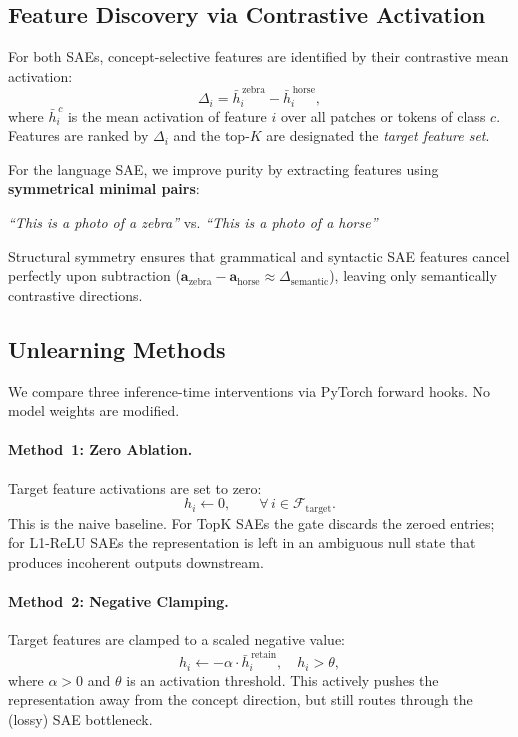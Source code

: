 \documentclass{article}
\begin{document}
\subsection{Feature Discovery via Contrastive Activation}

For both SAEs, concept-selective features are identified by their
contrastive mean activation:
\begin{equation}
  \Delta_i = \bar{h}_i^{\,\text{zebra}} - \bar{h}_i^{\,\text{horse}},
\end{equation}
where $\bar{h}_i^{\,c}$ is the mean activation of feature $i$ over all
patches or tokens of class $c$. Features are ranked by $\Delta_i$ and
the top-$K$ are designated the \emph{target feature set}.

For the language SAE, we improve purity by extracting features using
\textbf{symmetrical minimal pairs}:
\begin{center}
  \textit{``This is a photo of a zebra''}\;
  vs.\;
  \textit{``This is a photo of a horse''}
\end{center}
Structural symmetry ensures that grammatical and syntactic SAE features
cancel perfectly upon subtraction
($\mathbf{a}_{\text{zebra}} - \mathbf{a}_{\text{horse}}
 \approx \Delta_{\text{semantic}}$),
leaving only semantically contrastive directions.

\subsection{Unlearning Methods}
\label{sec:methods}

We compare three inference-time interventions via PyTorch forward hooks.
No model weights are modified.

\paragraph{Method~1: Zero Ablation.}
Target feature activations are set to zero:
\begin{equation}
  h_i \leftarrow 0, \qquad \forall\,i \in \mathcal{F}_{\text{target}}.
\end{equation}
This is the naive baseline. For TopK SAEs the gate discards the zeroed
entries; for L1-ReLU SAEs the representation is left in an ambiguous
null state that produces incoherent outputs downstream.

\paragraph{Method~2: Negative Clamping.}
Target features are clamped to a scaled negative value:
\begin{equation}
  h_i \leftarrow -\alpha \cdot \bar{h}_i^{\,\text{retain}},
  \quad h_i > \theta,
\end{equation}
where $\alpha>0$ and $\theta$ is an activation threshold. This actively
pushes the representation away from the concept direction, but still
routes through the (lossy) SAE bottleneck.
\end{document}
